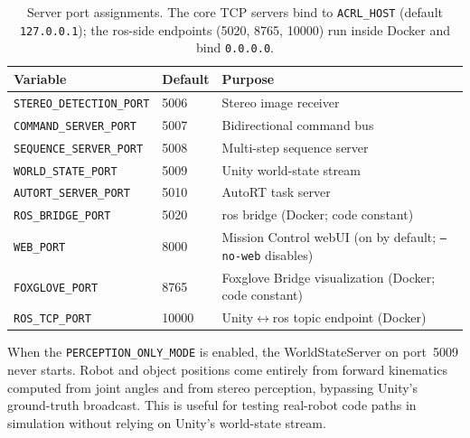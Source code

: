 \begin{table}[t]
	\centering
	\begin{tabular}{llp{6cm}}
		\toprule
		\textbf{Variable}                & \textbf{Default} & \textbf{Purpose}                                                  \\
		\midrule
		\texttt{STEREO\_DETECTION\_PORT} & 5006             & Stereo image receiver                                             \\
		\texttt{COMMAND\_SERVER\_PORT}   & 5007             & Bidirectional command bus                                         \\
		\texttt{SEQUENCE\_SERVER\_PORT}  & 5008             & Multi-step sequence server                                        \\
		\texttt{WORLD\_STATE\_PORT}      & 5009             & Unity world-state stream                                          \\
		\texttt{AUTORT\_SERVER\_PORT}    & 5010             & AutoRT task server                                                \\
		\texttt{ROS\_BRIDGE\_PORT}       & 5020             & \gls{ros} bridge (Docker; code constant)                          \\
		\texttt{WEB\_PORT}               & 8000             & Mission Control webUI (on by default; \texttt{--no-web} disables) \\
		\texttt{FOXGLOVE\_PORT}          & 8765             & Foxglove Bridge visualization (Docker; code constant)             \\
		\texttt{ROS\_TCP\_PORT}          & 10000            & Unity$\leftrightarrow$\gls{ros} topic endpoint (Docker)           \\
		\bottomrule
	\end{tabular}
	\caption{Server port assignments. The core TCP servers bind to
		\texttt{ACRL\_HOST} (default \texttt{127.0.0.1}); the \gls{ros}-side
		endpoints (5020, 8765, 10000) run inside Docker and bind \texttt{0.0.0.0}.}
	\label{tab:config_ports}
\end{table}

When the \texttt{PERCEPTION\_ONLY\_MODE} is enabled, the WorldStateServer on port~5009 never starts. Robot and object positions come entirely from forward kinematics computed from joint angles and from stereo perception, bypassing Unity's ground-truth broadcast. This is useful for testing real-robot code paths in simulation without relying on Unity's world-state stream.

